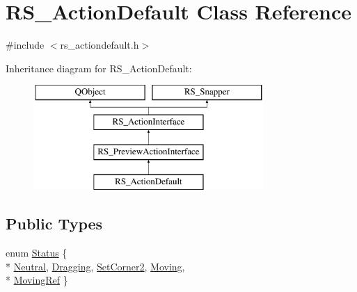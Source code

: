 \hypertarget{classRS__ActionDefault}{\section{R\-S\-\_\-\-Action\-Default Class Reference}
\label{classRS__ActionDefault}
}


{\ttfamily \#include $<$rs\-\_\-actiondefault.\-h$>$}

Inheritance diagram for R\-S\-\_\-\-Action\-Default\-:\begin{figure}[H]
\begin{center}
\leavevmode
\includegraphics[height=4.000000cm]{classRS__ActionDefault}
\end{center}
\end{figure}
\subsection*{Public Types}
\begin{DoxyCompactItemize}
\item 
enum \hyperlink{classRS__ActionDefault_ad26a7fa3d02107a86e4ad44276ee8e1c}{Status} \{ \\*
\hyperlink{classRS__ActionDefault_ad26a7fa3d02107a86e4ad44276ee8e1caecf914a039f05d75196e949386822851}{Neutral}, 
\hyperlink{classRS__ActionDefault_ad26a7fa3d02107a86e4ad44276ee8e1cab93e25eb8e74629529ef10a2b9e836bf}{Dragging}, 
\hyperlink{classRS__ActionDefault_ad26a7fa3d02107a86e4ad44276ee8e1ca704410bdbf6fc179e102171a2a677303}{Set\-Corner2}, 
\hyperlink{classRS__ActionDefault_ad26a7fa3d02107a86e4ad44276ee8e1ca0f5c04611a2fe57dff2a8df6322e7eb3}{Moving}, 
\\*
\hyperlink{classRS__ActionDefault_ad26a7fa3d02107a86e4ad44276ee8e1ca9841b3acd25316214793c1cc1f70a7ec}{Moving\-Ref}
 \}
\end{DoxyCompactItemize}

